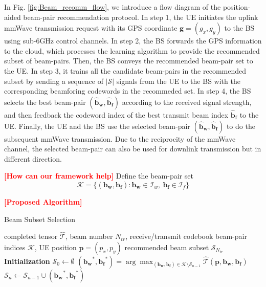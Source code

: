 \documentclass[12pt, draftcls, onecolumn]{IEEEtran}
\theoremstyle{plain}
\theoremstyle{definition}
\theoremstyle{remark}
\newcommand{\nt}[1]{\textcolor{red}{\textbf{[#1]}}}
\begin{document}
In Fig. \ref{fig:Beam_recomm_flow}, we introduce a flow diagram of the position-aided beam-pair recommendation protocol.
In step 1, the UE initiates the uplink mmWave transmission request with its GPS coordinate $\mathbf{g}=(g_x,g_y)$ to the BS using sub-6GHz control channels.
In step 2, the BS forwards the GPS information to the cloud, which processes the learning algorithm to provide the recommended subset of beam-pairs.
Then, the BS conveys the recommended beam-pair set to the UE.
In step 3, it trains all the candidate beam-pairs in the recommended subset by sending a sequence of $\vert\mathcal{S}\vert$ signals from the UE to the BS with the corresponding beamforing codewords in the recommeded set.
In step 4, the BS selects the best beam-pair $(\mathbf{\hat{b}_w},\mathbf{\hat{b}_f})$ according to the received signal strength, and then feedback the codeword index of the best transmit beam index $\mathbf{\hat{b}_f}$ to the UE.
Finally, the UE and the BS use the selected beam-pair $(\mathbf{\hat{b}_w},\mathbf{\hat{b}_f})$ to do the subsequent mmWave transmission.
Due to the reciprocity of the mmWave channel, the selected beam-pair can also be used for downlink transmission but in different direction.

\nt{How can our framework help}
Define the beam-pair set 
$$\mathcal{K}=\{(\mathbf{b_w},\mathbf{b_f}):\mathbf{b_w}\in\mathcal{I}_w,\ \mathbf{b_f}\in\mathcal{I}_f\}$$

\nt{Proposed Algorithm}
\begin{algorithm}
	\caption{Beam Subset Selection}
	\begin{algorithmic}[1]
		\INPUT completed tensor $\hat{\mathcal{T}}$, beam number $N_{tr}$, receive/transmit codebook beam-pair indices $\mathcal{K}$,
		UE position $\mathbf{p}=(p_x,p_y)$
		\OUTPUT recommended beam subset ${\mathcal S}_{N_{tr}}$
		\STATE \textbf{Initialization} ${\mathcal S}_0\leftarrow\emptyset$
		\STATE $(\mathbf{b_w}^*,\mathbf{b_f}^*)=\arg\max_{(\mathbf{b_w},\mathbf{b_f})\in \mathcal{K}\setminus\mathcal S_{n-1}}\hat{\mathcal{T}}(\mathbf{p},\mathbf{b_w},\mathbf{b_f})$
		\STATE $\mathcal {S}_n\leftarrow \mathcal {S}_{n-1}\cup {(\mathbf{b_w}^*,\mathbf{b_f}^*)}$
		\ENDFOR
	\end{algorithmic}
	\label{Beam_subset_selection}
\end{algorithm}
\end{document}
